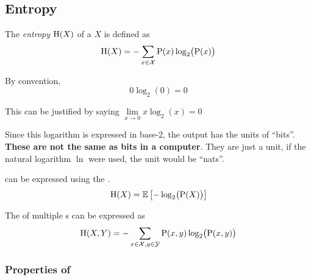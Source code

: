 \subsection{Entropy}\label{subsec:Entropy}
\begin{definition}[Entropy]\label{def:Entropy}
  The \emph{entropy} $\operatorname{\operatorname{H}}(X)$ of a  $X$ is defined as
  \begin{equation}\label{eq:Entropy}
    \operatorname{\operatorname{H}}(X) = - \sum\limits_{x \in \mathcal{X}} \operatorname{\operatorname{P}}(x) \log_{2}\bigl( \operatorname{\operatorname{P}}(x) \bigr)
  \end{equation}

  \begin{remark}[Probability is 0]\label{rmk:Entropy_Probability_0}
    By convention,
    \begin{equation}\label{eq:Entropy_Probability_0}
      0 \log_{2} (0) = 0
    \end{equation}

    This can be justified by saying $\lim\limits_{x \rightarrow 0} x \log_{2}(x) = 0$
  \end{remark}

  \begin{remark}\label{rmk:Entropy_Bits}
    Since this logarithm is expressed in base-2, the output has the units of ``bits''.
    \textbf{These are not the same as bits in a computer}.
    They are just a unit, if the natural logarithm $\ln$ were used, the unit would be ``nats''.
  \end{remark}

   can be expressed using the .
  \begin{equation}\label{eq:Entropy-Expected_Value}
    \operatorname{\operatorname{H}}(X) = \operatorname{\operatorname{\mathbb{E}}} \left[ - \log_{2}\bigl( \operatorname{\operatorname{P}}(X) \bigr) \right]
  \end{equation}

  The  of multiple s can be expressed as
  \begin{equation}\label{eq:Entropy-Multiple_Discrete_Random_Variables}
    \operatorname{\operatorname{H}}(X,Y) = - \sum\limits_{x \in \mathcal{X}, y \in \mathcal{Y}} \operatorname{\operatorname{P}}(x, y) \log_{2} \bigl( \operatorname{\operatorname{P}}(x, y) \bigr)
  \end{equation}
\end{definition}

\subsubsection{Properties of }\label{subsubsec:Entropy_Properties}

